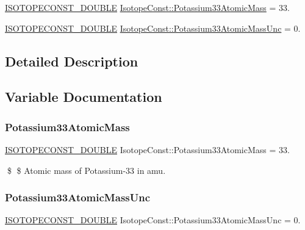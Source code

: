 \begin{DoxyCompactItemize}
\item 
\mbox{\hyperlink{group___isotope_const-_macros_ga8f45a7272ce02c0b4c65c44636ed719a}{I\+S\+O\+T\+O\+P\+E\+C\+O\+N\+S\+T\+\_\+\+D\+O\+U\+B\+LE}} \mbox{\hyperlink{group___isotope_const-_potassium-_k33_ga353bf9cae5daa3798db87088fb77fd1f}{Isotope\+Const\+::\+Potassium33\+Atomic\+Mass}} = 33.
\item 
\mbox{\hyperlink{group___isotope_const-_macros_ga8f45a7272ce02c0b4c65c44636ed719a}{I\+S\+O\+T\+O\+P\+E\+C\+O\+N\+S\+T\+\_\+\+D\+O\+U\+B\+LE}} \mbox{\hyperlink{group___isotope_const-_potassium-_k33_ga41266ad8ba8084fcd423ac598fba7f7f}{Isotope\+Const\+::\+Potassium33\+Atomic\+Mass\+Unc}} = 0.
\end{DoxyCompactItemize}


\subsection{Detailed Description}


\subsection{Variable Documentation}
\mbox{\label{group___isotope_const-_potassium-_k33_ga353bf9cae5daa3798db87088fb77fd1f}} 
\subsubsection{\texorpdfstring{Potassium33\+Atomic\+Mass}{Potassium33AtomicMass}}
{\footnotesize\ttfamily \mbox{\hyperlink{group___isotope_const-_macros_ga8f45a7272ce02c0b4c65c44636ed719a}{I\+S\+O\+T\+O\+P\+E\+C\+O\+N\+S\+T\+\_\+\+D\+O\+U\+B\+LE}} Isotope\+Const\+::\+Potassium33\+Atomic\+Mass = 33.}

\$ \$ Atomic mass of Potassium-\/33 in amu. \mbox{\label{group___isotope_const-_potassium-_k33_ga41266ad8ba8084fcd423ac598fba7f7f}} 
\subsubsection{\texorpdfstring{Potassium33\+Atomic\+Mass\+Unc}{Potassium33AtomicMassUnc}}
{\footnotesize\ttfamily \mbox{\hyperlink{group___isotope_const-_macros_ga8f45a7272ce02c0b4c65c44636ed719a}{I\+S\+O\+T\+O\+P\+E\+C\+O\+N\+S\+T\+\_\+\+D\+O\+U\+B\+LE}} Isotope\+Const\+::\+Potassium33\+Atomic\+Mass\+Unc = 0.}

